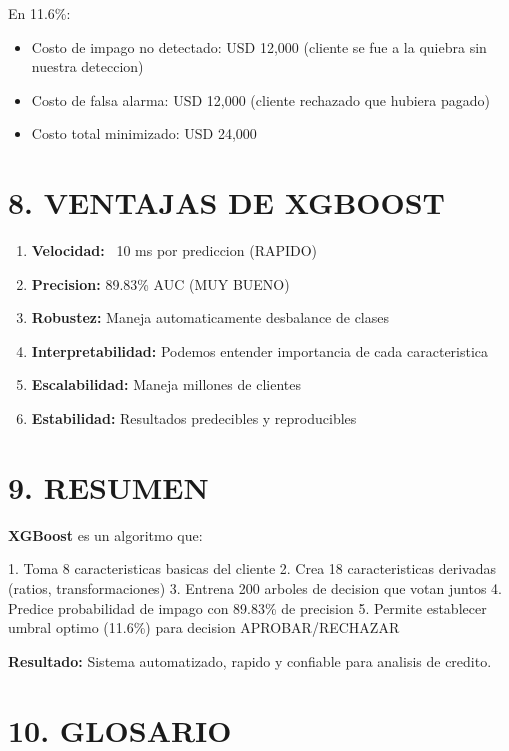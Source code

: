\documentclass[11pt]{article}
\begin{document}
En 11.6\%:
\begin{itemize}
\item Costo de impago no detectado: USD 12,000 (cliente se fue a la quiebra sin nuestra deteccion)
\item Costo de falsa alarma: USD 12,000 (cliente rechazado que hubiera pagado)
\item Costo total minimizado: USD 24,000
\end{itemize}

\section*{8. VENTAJAS DE XGBOOST}

\begin{enumerate}
\item \textbf{Velocidad:} ~10 ms por prediccion (RAPIDO)
\item \textbf{Precision:} 89.83\% AUC (MUY BUENO)
\item \textbf{Robustez:} Maneja automaticamente desbalance de clases
\item \textbf{Interpretabilidad:} Podemos entender importancia de cada caracteristica
\item \textbf{Escalabilidad:} Maneja millones de clientes
\item \textbf{Estabilidad:} Resultados predecibles y reproducibles
\end{enumerate}

\section*{9. RESUMEN}

\textbf{XGBoost} es un algoritmo que:

1. Toma 8 caracteristicas basicas del cliente
2. Crea 18 caracteristicas derivadas (ratios, transformaciones)
3. Entrena 200 arboles de decision que votan juntos
4. Predice probabilidad de impago con 89.83\% de precision
5. Permite establecer umbral optimo (11.6\%) para decision APROBAR/RECHAZAR

\textbf{Resultado:} Sistema automatizado, rapido y confiable para analisis de credito.

\section*{10. GLOSARIO}
\end{document}
